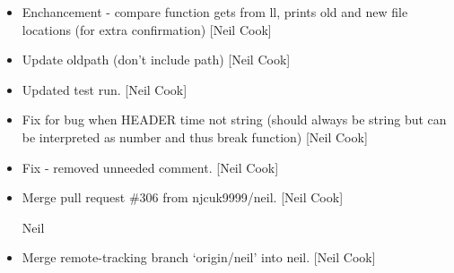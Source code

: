 \documentclass[a4paper,10pt,english]{report}
\begin{document}
\begin{itemize}
\item {} 
Enchancement - compare function gets  from ll, prints
old and new file locations (for extra confirmation) {[}Neil Cook{]}

\item {} 
Update oldpath (don’t include path) {[}Neil Cook{]}

\item {} 
Updated test run. {[}Neil Cook{]}

\item {} 
Fix for bug when HEADER time not string (should always be string but
can be interpreted as number and thus break function) {[}Neil Cook{]}

\item {} 
Fix - removed unneeded comment. {[}Neil Cook{]}

\item {} 
Merge pull request \#306 from njcuk9999/neil. {[}Neil Cook{]}

Neil

\item {} 
Merge remote-tracking branch ‘origin/neil’ into neil. {[}Neil Cook{]}

\end{itemize}
\end{document}
